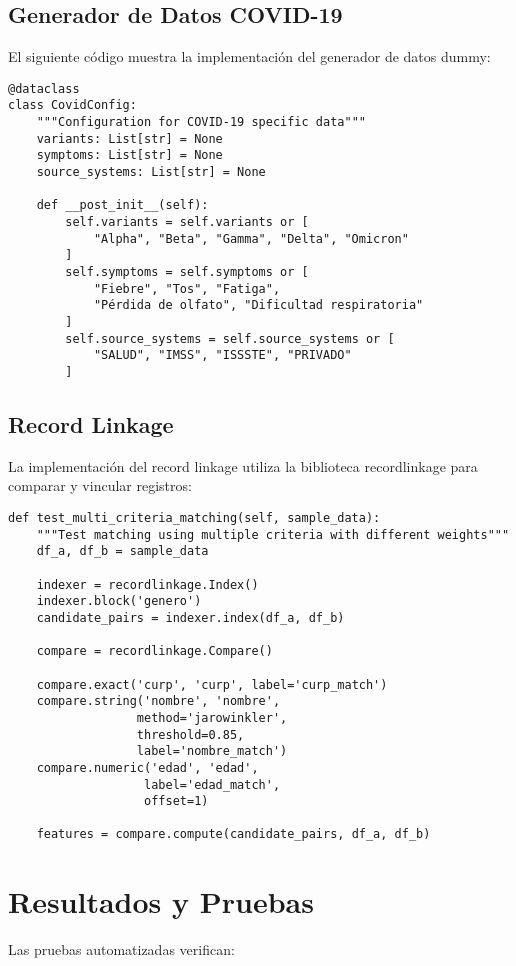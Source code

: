 \documentclass[12pt]{article}
\begin{document}
\subsection{Generador de Datos COVID-19}
El siguiente código muestra la implementación del generador de datos dummy:

\begin{lstlisting}[caption=Implementación del Generador de Datos COVID-19]
@dataclass
class CovidConfig:
    """Configuration for COVID-19 specific data"""
    variants: List[str] = None
    symptoms: List[str] = None
    source_systems: List[str] = None

    def __post_init__(self):
        self.variants = self.variants or [
            "Alpha", "Beta", "Gamma", "Delta", "Omicron"
        ]
        self.symptoms = self.symptoms or [
            "Fiebre", "Tos", "Fatiga", 
            "Pérdida de olfato", "Dificultad respiratoria"
        ]
        self.source_systems = self.source_systems or [
            "SALUD", "IMSS", "ISSSTE", "PRIVADO"
        ]
\end{lstlisting}

\subsection{Record Linkage}
La implementación del record linkage utiliza la biblioteca recordlinkage para 
comparar y vincular registros:

\begin{lstlisting}[caption=Implementación de Record Linkage]
def test_multi_criteria_matching(self, sample_data):
    """Test matching using multiple criteria with different weights"""
    df_a, df_b = sample_data
    
    indexer = recordlinkage.Index()
    indexer.block('genero')
    candidate_pairs = indexer.index(df_a, df_b)
    
    compare = recordlinkage.Compare()
    
    compare.exact('curp', 'curp', label='curp_match')
    compare.string('nombre', 'nombre', 
                  method='jarowinkler', 
                  threshold=0.85,
                  label='nombre_match')
    compare.numeric('edad', 'edad', 
                   label='edad_match',
                   offset=1)
    
    features = compare.compute(candidate_pairs, df_a, df_b)
\end{lstlisting}

\section{Resultados y Pruebas}
Las pruebas automatizadas verifican:
\end{document}
